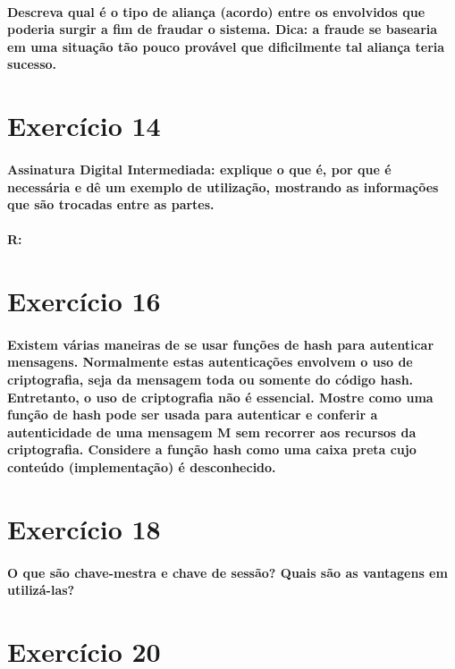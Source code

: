 \documentclass[10pt,a4paper]{report}
\begin{document}
\paragraph{Descreva qual é o tipo de aliança (acordo) entre os envolvidos que poderia surgir a fim de fraudar o sistema. Dica: a fraude se basearia em uma situação tão pouco provável que dificilmente tal aliança teria sucesso.}

\section*{Exercício 14}
\paragraph{Assinatura Digital Intermediada: explique o que é, por que é necessária e dê um exemplo de utilização, mostrando as informações que são trocadas entre as partes.}
\paragraph{R:}

\section*{Exercício 16}
\paragraph{Existem várias maneiras de se usar funções de hash para autenticar mensagens. Normalmente estas autenticações envolvem o uso de criptografia, seja da mensagem toda ou somente do código hash. Entretanto, o uso de criptografia não é essencial. Mostre como uma função de hash pode ser usada para autenticar e conferir a autenticidade de uma mensagem M sem recorrer aos recursos da criptografia. Considere a função hash como uma caixa preta cujo conteúdo (implementação) é desconhecido.}

\section*{Exercício 18}
\paragraph{O que são chave-mestra e chave de sessão? Quais são as vantagens em utilizá-las?}

\section*{Exercício 20}
\end{document}

